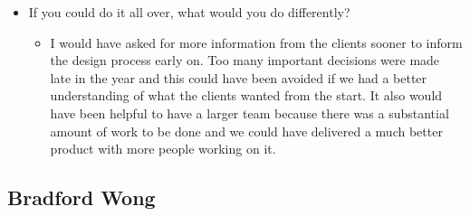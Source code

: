 \documentclass[onecolumn, draftclsnofoot,10pt, compsoc]{IEEEtran}
\begin{document}
\begin{itemize}
\begin{itemize}
     \end{itemize}
     \item If you could do it all over, what would you do differently?
     \begin{itemize}
         \item I would have asked for more information from the clients sooner to inform the design process early on. Too many important decisions were made late in the year and this could have been avoided if we had a better understanding of what the clients wanted from the start. It also would have been helpful to have a larger team because there was a substantial amount of work to be done and we could have delivered a much better product with more people working on it. 
     \end{itemize}
 \end{itemize}
  \subsection{Bradford Wong}
\end{document}

